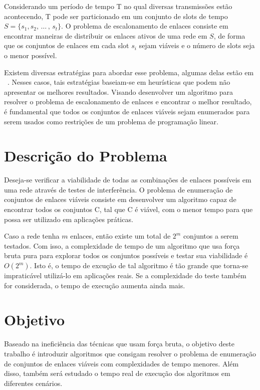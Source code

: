Considerando um período de tempo T no qual diversas transmissões estão acontecendo, T pode ser particionado em um conjunto de slots de tempo $S=\{s_1, s_2, \, \ldots \, , \, s_t\}$. O problema de escalonamento de enlaces consiste em encontrar maneiras de distribuir os enlaces ativos de uma rede em $S$, de forma que os conjuntos de enlaces em cada slot $s_i$ sejam viáveis e o número de slots seja o menor possível.

Existem diversas estratégias para abordar esse problema, algumas delas estão em ~\cite{ciscoforecast, elevationdata}. Nesses casos, tais estratégias baseiam-se em heurísticas que podem não apresentar os melhores resultados. Visando desenvolver um algoritmo para resolver o problema de escalonamento de enlaces e encontrar o melhor resultado, é fundamental que todos os conjuntos de enlaces viáveis sejam enumerados para serem usados como restrições de um problema de programação linear.

\section{Descrição do Problema}

Deseja-se verificar a viabilidade de todas as combinações de enlaces possíveis em uma rede através de testes de interferência. O problema de enumeração de conjuntos de enlaces viáveis consiste em desenvolver um algoritmo capaz de encontrar todos os conjuntos C, tal que C é viável, com o menor tempo para que possa ser utilizado em aplicações práticas.

Caso a rede tenha $m$ enlaces, então existe um total de $2^m$ conjuntos a serem testados. Com isso, a complexidade de tempo de um algoritmo que usa força bruta pura para explorar todos os conjuntos possíveis e testar sua viabilidade é $O(2^m)$. Isto é, o tempo de excução de tal algoritmo é tão grande que torna-se impraticável utilizá-lo em aplicações reais. Se a complexidade do teste também for considerada, o tempo de execução aumenta ainda mais. 

\section{Objetivo}

Baseado na ineficiência das técnicas que usam força bruta, o objetivo deste trabalho é introduzir algoritmos que consigam resolver o problema de enumeração de conjuntos de enlaces viáveis com complexidades de tempo menores. Além disso, também será estudado o tempo real de execução dos algoritmos em diferentes cenários.
 
